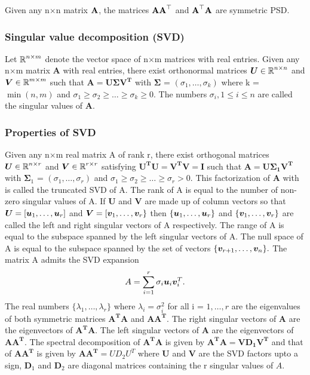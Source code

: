 Given any n$\times$n matrix $\textbf{A}$, the matrices $\textbf{A}\textbf{A}^{\top}$
and $\textbf{A}^{\top}\textbf{A}$ are symmetric PSD.

\subsubsection{Singular value decomposition (SVD)}
Let $\operatorname{\mathbb{R}}^{n \times m}$ denote the vector space of n$\times$m matrices with real entries. Given any n$\times$m matrix $\bm{A}$ with real entries, there exist orthonormal matrices $\bm{U} \in \operatorname{\mathbb{R}}^{n \times n}$ and $\bm{V} \in \operatorname{\mathbb{R}}^{m \times m}$ such that 
$\bm{\displaystyle A = U \Sigma V^{T}}$ with $\bm{\Sigma}$ = $(\sigma_{1}, \ldots, \sigma_{k})$ where  k = $\min(n, m)$ and
 $\sigma_{1} \geq \sigma_{2} \geq \ldots \geq \sigma_{k} \geq 0$.
The numbers $\sigma_{i}, 1\leq i\leq n$ are called the singular values of $\bm{A}$. 


\subsubsection{Properties of SVD}
Given any n$\times$m real matrix A of rank r, there exist  orthogonal matrices 
$\bm{U} \in \operatorname{\mathbb{R}}^{n \times r}$ and $\bm{V} \in \operatorname{\mathbb{R}}^{r \times r}$ 
satisfying $\bm{U^{T}U = V^{T}V = I}$ such that $\bm{\text{A} = \text{U} \Sigma_{1} \text{V}^{T}}$ with $\bm{\Sigma}_{1}$ = $(\sigma_{1}, \ldots, \sigma_{r})$ and $\sigma_{1} \geq \sigma_{2} \geq \ldots \geq \sigma_{r} > 0$.
This factorization of $\bm{A}$ with  is called the truncated SVD of A.
The rank of A is equal to the number of non-zero singular values of A.
If $\bm{U}$ and $\bm{V}$ are made up of column vectors so that  $\bm{U} = [\boldsymbol{u}_1, \ldots, \boldsymbol{u}_{r}]$ and $\bm{V} = [\boldsymbol{v}_{1}, \ldots, \boldsymbol{v}_{r}\}$ then $\{ \boldsymbol{u}_1, \ldots, \boldsymbol{u}_{r} \}$  and $\{\boldsymbol{v}_{1}, \ldots, \boldsymbol{v}_{r} \}$ are called the left and right singular vectors of A respectively. The range of A is equal to the subspace spanned by the left singular vectors of A. The null space of A is equal to the subspace spanned by the set of vectors $\{\boldsymbol{v}_{r+1}, \ldots, \boldsymbol{v}_{n} \}.$
The matrix A admits the SVD expansion 
\[
A = \sum_{i=1}^{r} \sigma_{i} \boldsymbol{u}_{i} \boldsymbol{v}_{i}^{T}.
\]
The real numbers $\{\lambda_{1}, \ldots, \lambda_{r}\}$ where $\lambda_{i} = \sigma_{i}^{2}$ for all i = $1 , \ldots, r$ are the eigenvalues of both symmetric matrices $\bm{A^{T}A}$ and $\bm{AA^{T}}.$ The right singular vectors of $\bm{A}$ are the eigenvectors of $\bm{A^{T}A}.$ The left singular vectors of $\bm{A}$ are the eigenvectors of $\bm{AA^{T}}.$ The spectral decomposition of $\bm{A^{T}A}$ is given by $\bm{A^{T}A  = V D_{1} V^{T}}$ and that of  $\bm{AA^{T}}$ is given by  $\bm{AA^{T}} = U D_{2} U^{T}$ where $\bm{U}$ and $\bm{V}$ are the SVD factors upto a sign, $\bm{D}_{1}$ and $\bm{D}_{2}$ are diagonal matrices containing the r
singular values of $A$.

